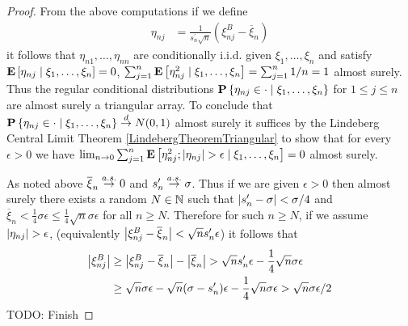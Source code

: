 \begin{proof}
From the above computations if we define 
\begin{align*}
\eta_{nj} &= \frac{1}{s_n^\prime \sqrt{n}} (\xi^B_{nj} - \overline{\xi}_n)
\end{align*}
it follows that $\eta_{n1}, \dotsc, \eta_{nn}$ are conditionally i.i.d. given $\xi_1, \dotsc, \xi_n$ and satisfy $\cexpectationlong{\xi_1, \dotsc, \xi_n} {\eta_{nj}}=0$, 
$\sum_{j=1}^n \cexpectationlong{\xi_1, \dotsc, \xi_n} {\eta^2_{nj}}=\sum_{j=1}^n 1/n = 1$ almost surely.  Thus the regular conditional distributions $\cprobability{\xi_1, \dotsc, \xi_n}{\eta_{nj} \in \cdot}$ for $1 \leq j \leq n$ are almost surely a triangular array.  To conclude that $\cprobability{\xi_1, \dotsc, \xi_n}{\eta_{nj} \in \cdot} \todist N(0,1)$ almost surely it suffices by the Lindeberg Central Limit Theorem \ref{LindebergTheoremTriangular} to show that for every $\epsilon > 0$ we have $\lim_{n \to 0} \sum_{j=1}^n \cexpectationlong{\xi_1, \dotsc, \xi_n}{\eta^2_{nj} ; \abs{\eta_{nj}} > \epsilon} = 0$ almost surely.

As noted above $\overline{\xi}_n \toas 0$ and $s^\prime_n \toas \sigma$.  Thus if we are given $\epsilon > 0$ then almost surely there exists a random $N \in \naturals$ such that $\abs{s^\prime_n - \sigma} < \sigma/4$ and
$\overline{\xi}_n < \frac{1}{4} \sigma \epsilon \leq \frac{1}{4} \sqrt{n} \sigma \epsilon$ for all $n \geq N$.  Therefore for such $n \geq N$, if we assume $\abs{\eta_{nj}} > \epsilon$,  (equivalently $\abs{\xi^B_{nj} - \overline{\xi}_n} < \sqrt{n} s^\prime_n \epsilon$) it follows that
\begin{align*}
\abs{\xi^B_{nj}} &\geq \abs{\xi^B_{nj} - \overline{\xi}_n} - \abs{\overline{\xi}_n} > \sqrt{n} s^\prime_n \epsilon - \frac{1}{4} \sqrt{n} \sigma \epsilon \\
&\geq \sqrt{n} \sigma \epsilon - \sqrt{n} (\sigma-s^\prime_n) \epsilon - \frac{1}{4} \sqrt{n} \sigma \epsilon > \sqrt{n} \sigma \epsilon /2
\end{align*}
TODO: Finish
\end{proof}